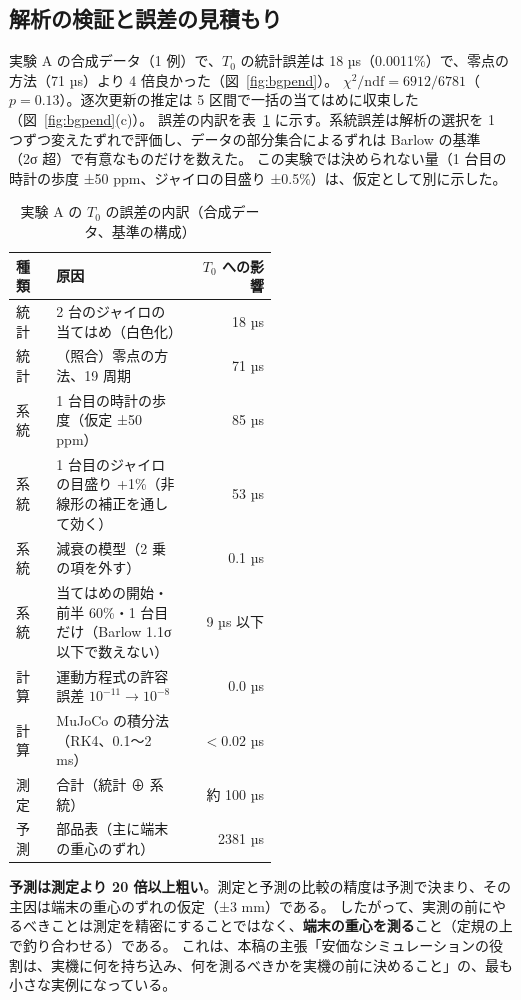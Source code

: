 \documentclass[paper=a4paper,fontsize=10pt,twocolumn,column_gap=2zw,line_length=24zw,number_of_lines=46,head_space=20mm]{jlreq}
\begin{document}
\subsection{解析の検証と誤差の見積もり}

実験 A の合成データ（1 例）で、$T_0$ の統計誤差は 18 µs（0.0011\%）で、零点の方法（71 µs）より 4 倍良かった（図~\ref{fig:bgpend}）。
$\chi^2/\mathrm{ndf} = 6912/6781$（$p=0.13$）。逐次更新の推定は 5 区間で一括の当てはめに収束した（図~\ref{fig:bgpend}(c)）。
誤差の内訳を表~\ref{tab:bangai} に示す。系統誤差は解析の選択を 1 つずつ変えたずれで評価し、データの部分集合によるずれは Barlow の基準 \cite{barlow2002}（2σ 超）で有意なものだけを数えた。
この実験では決められない量（1 台目の時計の歩度 ±50 ppm、ジャイロの目盛り ±0.5\%）は、仮定として別に示した。

\begin{table}[t]\centering\footnotesize
\caption{実験 A の $T_0$ の誤差の内訳（合成データ、基準の構成）}\label{tab:bangai}
\setlength{\tabcolsep}{2.5pt}
\begin{tabular}{lp{0.52\linewidth}r}\toprule
種類 & 原因 & $T_0$ への影響 \\\midrule
統計 & 2 台のジャイロの当てはめ（白色化） & 18 µs \\
統計 & （照合）零点の方法、19 周期 & 71 µs \\
系統 & 1 台目の時計の歩度（仮定 ±50 ppm） & 85 µs \\
系統 & 1 台目のジャイロの目盛り +1\%（非線形の補正を通して効く） & 53 µs \\
系統 & 減衰の模型（2 乗の項を外す） & 0.1 µs \\
系統 & 当てはめの開始・前半 60\%・1 台目だけ（Barlow 1.1σ 以下で数えない） & 9 µs 以下 \\
計算 & 運動方程式の許容誤差 $10^{-11}\to10^{-8}$ & 0.0 µs \\
計算 & MuJoCo の積分法（RK4、0.1〜2 ms） & $<0.02$ µs \\\midrule
測定 & 合計（統計 ⊕ 系統） & 約 100 µs \\
予測 & 部品表（主に端末の重心のずれ） & 2381 µs \\\bottomrule
\end{tabular}
\end{table}

\textbf{予測は測定より 20 倍以上粗い}。測定と予測の比較の精度は予測で決まり、その主因は端末の重心のずれの仮定（±3 mm）である。
したがって、実測の前にやるべきことは測定を精密にすることではなく、\textbf{端末の重心を測る}こと（定規の上で釣り合わせる）である。
これは、本稿の主張「安価なシミュレーションの役割は、実機に何を持ち込み、何を測るべきかを実機の前に決めること」の、最も小さな実例になっている。
\end{document}
